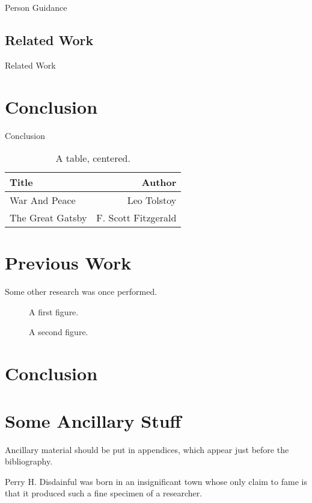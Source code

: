 \documentclass[12pt]{gatech-thesis}
\begin{document}
Person Guidance

\section{Related Work}

Related Work

\chapter{Conclusion}

Conclusion


\begin{table}
\caption{A table, centered.}
\begin{center}
\begin{tabular}{|l|r|}
  \hline 
Title & Author \\
\hline
War And Peace & Leo Tolstoy \\
The Great Gatsby & F. Scott Fitzgerald \\ \hline
\end{tabular}
\end{center}
\end{table}
\chapter{Previous Work}

Some other research was once performed.

\begin{figure}
\caption{A first figure.}
\end{figure}

\begin{figure}
\caption{A second figure.}
\end{figure}
\chapter{Conclusion}

\nocite{*}
\appendix
\chapter{Some Ancillary Stuff}

Ancillary material should be put in appendices, which 
appear just before the bibliography. 

\begin{postliminary}
{}
\begin{vita}
Perry H. Disdainful was born in an insignificant town
whose only claim to fame is that it produced such a fine
specimen of a researcher.
\end{vita}
\end{postliminary}
\end{document}
